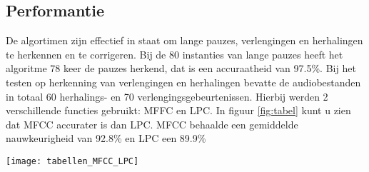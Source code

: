 \subsection{Performantie}
De algortimen zijn effectief in staat om lange pauzes, verlengingen en herhalingen te herkennen en te corrigeren. Bij de 80 instanties van lange pauzes heeft het algoritme 78 keer de pauzes herkend, dat is een accuraatheid van 97.5\%. Bij het testen op herkenning van verlengingen en herhalingen bevatte de audiobestanden in totaal 60 herhalings- en 70 verlengingsgebeurtenissen. Hierbij werden 2 verschillende functies gebruikt: MFFC en LPC. In figuur \ref{fig:tabel} kunt u zien dat MFCC accurater is dan LPC. MFCC behaalde een gemiddelde nauwkeurigheid van 92.8\% en LPC een 89.9\% \autocite{KN2020}

\begin{center}
    \texttt{[image: tabellen\_MFCC\_LPC]}
    \label{fig:tabel}
\end{center}
 